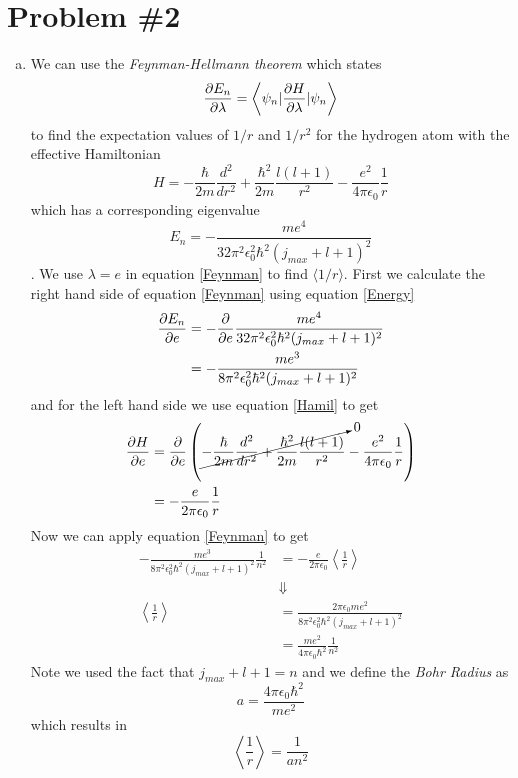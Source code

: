 \documentclass[11pt]{article}
\numberwithin{equation}{section}
\begin{document}
\section{Problem \#2}
\begin{enumerate}[(a)]
\item
We can use the \emph{Feynman-Hellmann theorem} which states
\begin{equation}
\frac{\partial{E_n}}{\partial{\lambda}} = \left\langle\psi_n|\frac{\partial{H}}{\partial{\lambda}}|\psi_n\right\rangle
\label{Feynman}
\end{equation}
to find the expectation values of $1/r$ and $1/r^2$ for the hydrogen atom with the effective Hamiltonian 
\begin{equation}
H = -\frac{\hbar}{2m}\frac{d^2}{dr^2} + \frac{\hbar^2}{2m}\frac{l(l+1)}{r^2} - \frac{e^2}{4\pi\epsilon_0}\frac{1}{r}
\label{Hamil}
\end{equation}
which has a corresponding eigenvalue
\begin{equation}
E_n = -\frac{me^4}{32\pi^2\epsilon_0^2\hbar^2(j_{max}+l+1)^2}
\label{Energy}
\end{equation}
. We use $\lambda=e$ in equation \ref{Feynman} to find $\langle1/r\rangle$. First we calculate the right hand side of equation \ref{Feynman} using equation \ref{Energy}
\begin{align*}
\frac{\partial{E_n}}{\partial{e}} &=  -\frac{\partial{}}{\partial{e}}\frac{me^4}{32\pi^2\epsilon_0^2\hbar^2(j_{max}+l+1)^2}\\
&= -\frac{me^3}{8\pi^2\epsilon_0^2\hbar^2(j_{max}+l+1)^2}
\end{align*}
and for the left hand side we use equation \ref{Hamil} to get
\begin{align*}
\frac{\partial{H}}{\partial{e}} &= \frac{\partial{}}{\partial{e}}\left(\cancelto{0}{-\frac{\hbar}{2m}\frac{d^2}{dr^2} + \frac{\hbar^2}{2m}\frac{l(l+1)}{r^2}} - \frac{e^2}{4\pi\epsilon_0}\frac{1}{r}\right)\\
&= -\frac{e}{2\pi\epsilon_0}\frac{1}{r}
\end{align*}
Now we can apply equation \ref{Feynman} to get
\begin{align*}
-\frac{me^3}{8\pi^2\epsilon_0^2\hbar^2(j_{max}+l+1)^2}\frac{1}{n^2} &= -\frac{e}{2\pi\epsilon_0}\left\langle\frac{1}{r}\right\rangle\\
&\Downarrow\\
\left\langle\frac{1}{r}\right\rangle &= \frac{2\pi\epsilon_0me^2}{8\pi^2\epsilon_0^2\hbar^2(j_{max}+l+1)^2}\\
&= \frac{me^2}{4\pi\epsilon_0\hbar^2}\frac{1}{n^2}
\end{align*}
Note we used the fact that $j_{max} + l +1 = n$ and we define the \emph{Bohr Radius} as
$$a = \frac{4\pi\epsilon_0\hbar^2}{me^2}$$
which results in
$$\left\langle\frac{1}{r}\right\rangle = \frac{1}{an^2}$$


\end{enumerate}
\end{document}

